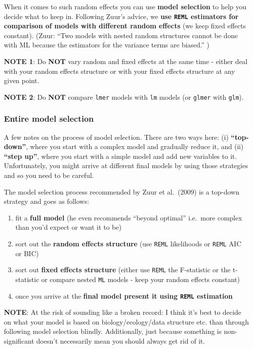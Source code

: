 \documentclass[
]{article}
\providecommand{\tightlist}{%
  \setlength{\itemsep}{0pt}\setlength{\parskip}{0pt}}
\begin{document}
When it comes to such random effects you can use \textbf{model
selection} to help you decide what to keep in. Following Zuur's advice,
we \textbf{use \texttt{REML} estimators for comparison of models with
different random effects} (we keep fixed effects constant). (Zuur: ``Two
models with nested random structures cannot be done with ML because the
estimators for the variance terms are biased.'' )

\textbf{NOTE 1}: Do \textbf{NOT} vary random and fixed effects at the
same time - either deal with your random effects structure or with your
fixed effects structure at any given point.

\textbf{NOTE 2}: Do \textbf{NOT} compare \texttt{lmer} models with
\texttt{lm} models (or \texttt{glmer} with \texttt{glm}).

\subsubsection{Entire model selection}\label{entire-model-selection}

A few notes on the process of model selection. There are two ways here:
(i) \textbf{``top-down''}, where you start with a complex model and
gradually reduce it, and (ii) \textbf{``step up''}, where you start with
a simple model and add new variables to it. Unfortunately, you might
arrive at different final models by using those strategies and so you
need to be careful.

The model selection process recommended by Zuur et al.~(2009) is a
top-down strategy and goes as follows:

\begin{enumerate}
\def\labelenumi{\arabic{enumi}.}
\tightlist
\item
  fit a \textbf{full model} (he even recommends ``beyond optimal''
  i.e.~more complex than you'd expect or want it to be)
\item
  sort out the \textbf{random effects structure} (use \texttt{REML}
  likelihoods or \texttt{REML} AIC or BIC)
\item
  sort out \textbf{fixed effects structure} (either use \texttt{REML}
  the F-statistic or the t-statistic or compare nested \texttt{ML}
  models - keep your random effects constant)
\item
  once you arrive at the \textbf{final model present it using
  \texttt{REML} estimation}
\end{enumerate}

\textbf{NOTE}: At the risk of sounding like a broken record: I think
it's best to decide on what your model is based on biology/ecology/data
structure etc. than through following model selection blindly.
Additionally, just because something is non-significant doesn't
necessarily mean you should always get rid of it.
\end{document}

